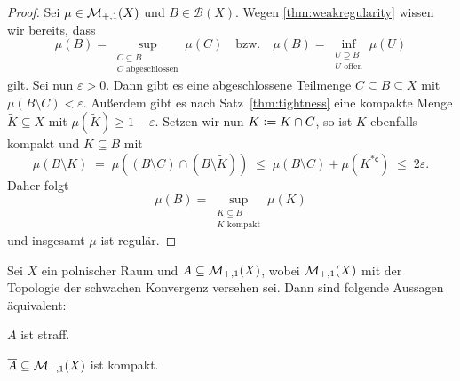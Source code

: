 \documentclass[../main/main.tex]{subfiles}
\begin{document}
	\begin{proof}
		Sei $\mu \in \mathcal{M}_{+,1}(X)$ und $B \in \mathcal{B}(X)$. 
		Wegen \ref{thm:weakregularity} wissen wir bereits, dass 
		\[\mu(B) = \sup_{\substack{C \subseteq B \\ C \text{ abgeschlossen}}} \mu(C) 
		\quad \text{bzw.} \quad \mu(B) = \inf_{\substack{U \supseteq B \\ U \text{ offen}}} 
		\mu(U)\]
		gilt. Sei nun $\varepsilon > 0$. Dann gibt es eine abgeschlossene Teilmenge 
		$C \subseteq B \subseteq X$ mit $\mu(B \setminus C) < \varepsilon$. 
		Außerdem gibt es nach Satz~\ref{thm:tightness} eine kompakte Menge 
		$\tilde{K} \subseteq X$ mit $\mu(\tilde{K}) \geq 1 - \varepsilon$. Setzen 
		wir nun $K \vcentcolon = \tilde{K} \cap C$, so ist $K$ ebenfalls kompakt und 
		$K \subseteq B$ mit 
		\[ \mu(B \setminus K) 
		\; = \; \mu((B \setminus C) \cap (B \setminus \tilde{K})) 
		\; \leq \; \mu(B \setminus C) + \mu(K^{\ast \mathsf{c}}) 
		\; \leq \; 2 \varepsilon \text{.} \]
		Daher folgt 
		\[\mu(B) 
		= \sup_{\substack{K \subseteq B \\ K \text{ kompakt}}} \mu(K)\] 
		und insgesamt $\mu$ ist regulär.
	\end{proof}

	\begin{Satz}[Prokhorov]
		\label{thm:prokhorov}
		Sei $X$ ein polnischer Raum und $A \subseteq \mathcal{M}_{+,1}(X)$, wobei $\mathcal{M}_{+,1}(X)$ mit der 
		Topologie der schwachen Konvergenz versehen sei. Dann sind folgende Aussagen äquivalent:
		\begin{equivalentthm}
			\item $A$ ist straff.
			\item $\overline{A} \subseteq \mathcal{M}_{+,1}(X)$ ist kompakt.
		\end{equivalentthm}
	\end{Satz}
\end{document}
